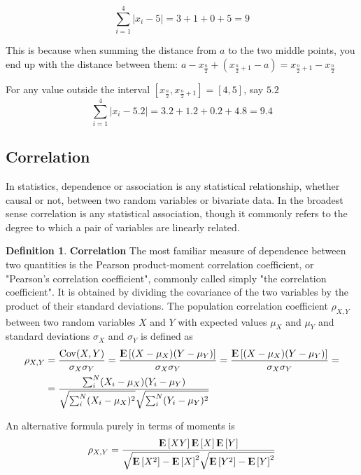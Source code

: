 \documentclass[12pt, letterpaper]{article}
\theoremstyle{definition}
\newtheorem{definition}{Definition}[section]
\newcommand{\E}{{\rm I\kern-.3em E}}
\newcommand{\Cov}{\mathrm{Cov}}
\DeclarePairedDelimiter\autobracket{(}{)}
\newcommand{\br}[1]{\autobracket*{#1}}
\begin{document}
$$
\sum_{i=1}^4|x_i-5|=3+1+0+5=9
$$

This is because when summing the distance from $a$ to the two middle points, you end up with the distance between them: $a-x_{\tfrac{n}{2}}+(x_{\tfrac{n}{2}+1}-a) = x_{\tfrac{n}{2}+1}-x_{\tfrac{n}{2}}$

For any value outside the interval $\left[x_{\tfrac{n}{2}},x_{\tfrac{n}{2}+1}\right]=[4,5]$, say $5.2$
$$
\sum_{i=1}^4|x_i-5.2|=3.2+1.2+0.2+4.8=9.4
$$

\subsection{Correlation}
In statistics, dependence or association is any statistical relationship, whether causal or not, between two random variables or bivariate data. In the broadest sense correlation is any statistical association, though it commonly refers to the degree to which a pair of variables are linearly related.
\begin{definition}{\textbf{Correlation}}
The most familiar measure of dependence between two quantities is the Pearson product-moment correlation coefficient, or "Pearson's correlation coefficient", commonly called simply "the correlation coefficient". It is obtained by dividing the covariance of the two variables by the product of their standard deviations. The population correlation coefficient $\rho_{X,Y}$ between two random variables $X$ and $Y$ with expected values $\mu_X$ and $\mu_Y$ and standard deviations $\sigma _{X}$ and $\sigma_Y$ is defined as
\begin{equation}
\begin{aligned}
\rho_{X,Y}&= \frac{\Cov(X,Y)}{\sigma_X \sigma_Y} = \frac{\E\left[ \br{X -\mu_X} \br{Y -\mu_Y}\right]}{\sigma_X \sigma_Y} = \frac{\E\left[ \br{X -\mu_X} \br{Y -\mu_Y}\right]}{\sigma_X \sigma_Y} =\\
&= \frac{\sum_i^N \br{X_i -\mu_X} \br{Y_i -\mu_Y}}{\sqrt{\sum_i^N(X_i-\mu_X)^2}\sqrt{\sum_i^N(Y_i-\mu_Y)^2}}
\end{aligned}
\end{equation}

An alternative formula purely in terms of moments is
\begin{equation}
\rho_{X,Y} = \frac{  \E\left[ XY \right]     \E\left[ X \right]   \E\left[ Y \right]   }   {\sqrt{\E\left[ X^2\right]-\E\left[ X\right]^2}                      \sqrt{  \E\left[ Y^2\right] -    \E\left[ Y \right]^2} } 
\end{equation}
\end{definition}
\end{document}
